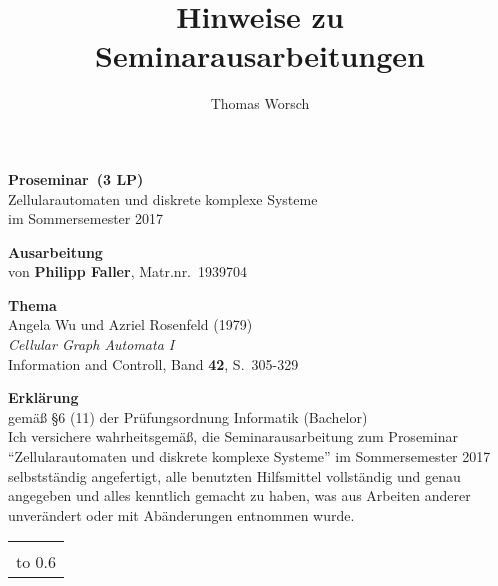 \documentclass[11pt]{article}
\author{Thomas Worsch}
\title{Hinweise zu Seminarausarbeitungen}
\newcommand{\teilnehmername}{Philipp Faller} %
\newcommand{\teilnehmermatrnr}{1939704}        %
\newcommand{\seminarart}{Proseminar}           %
\newcommand{\seminarlp}{3 LP}                  %
\newcommand{\seminarjahr}{2017}                %
\begin{document}
{\thispagestyle{empty}\large\sffamily\raggedright
%
%
\unskip %
\noindent \textbf{\Large \seminarart\ (\seminarlp)} 
\\[\baselineskip]
%
Zellularautomaten und diskrete komplexe Systeme
\\[1ex]
%
im Sommersemester \seminarjahr

\vspace*{3\baselineskip}

\noindent \textbf{\Large Ausarbeitung} \\[\baselineskip]
%
von \textbf{\teilnehmername}, Matr.nr.~\teilnehmermatrnr

\vspace*{3\baselineskip}

\noindent \textbf{\Large Thema} \\[\baselineskip]
%
%
Angela Wu und Azriel Rosenfeld (1979)\\[1ex]
%
\textit{Cellular Graph Automata I }\\[1ex]
%
Information and Controll, Band \textbf{42}, S.~305-329
}
\clearpage
{\thispagestyle{empty}\raggedright

\noindent \textbf{\Large Erklärung}\\[1ex]
gemäß \S 6 (11) der Prüfungsordnung Informatik %
(Bachelor) %
\\[\baselineskip]

\noindent
Ich versichere wahrheitsgemäß, die Seminarausarbeitung zum
\seminarart{} "`Zellularautomaten und diskrete komplexe Systeme"' im
Sommersemester \seminarjahr{} selbstständig angefertigt, alle
benutzten Hilfsmittel vollständig und genau angegeben und alles
kenntlich gemacht zu haben, was aus Arbeiten anderer unverändert oder
mit Abänderungen entnommen wurde.

\vspace*{30mm}
\noindent
\begin{tabular}{@{}l}
  \hline
   \\[-1ex]
  \hbox to 0.6\textwidth{(\teilnehmername, Matr.nr.~\teilnehmermatrnr) \hss}
\end{tabular}
}
\end{document}
